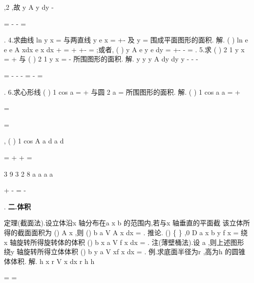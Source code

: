 ,2 ,故
y
A
y
dy
-


=
-
-
=




\int 
. 
4.求曲线
ln
y
x
=
与两直线
y
e
x
=
+-
及
y =
围成平面图形的面积. 
解.
(
)
ln
e
e
e
A
xdx
e
x dx
+
=
+
+-
=
\int 
\int 
;或者,
(
)
y
A
e
y
e
dy
=
+-
-
=
\int 
. 
5.求
(
)
2 1
y
x
=
+
与
(
)
2 1
y
x
=
-
所围图形的面积. 
解.
y
y
y
A
dy
dy
y
-
-
-






=
-
-
-
=
-
=












\int 
\int 
. 
6.求心形线
(
)
1 cos
a
\rho 
\theta 
=
+
与圆
2 a
\rho =
所围图形的面积. 
解.
(
)
1 cos
a
a
\rho 
\theta 
\pi 
\theta 
\rho 
=
+

\Rightarrow 
=

=

,
(
)
1 cos
A
a
d
a
d
\pi 
\pi 
\pi 
\theta 
\theta 
\theta 






=
+
+
=










\int 
{} 3
9 3
2 8
a
a
a
a
\pi 
\pi 
\pi 




+
-
=
-












. 
\vspace{4pt}
{\bfseries \textcolor{lyred}{二.体积}}

\textcolor{lyred}{定理(截面法)}.设立体\Omega 沿x 轴分布在a
x
b
\le 
\le 
的范围内,若与x 轴垂直的平面截 
该立体所得的截面面积为
()
A x ,则
()
b
a
V
A x dx
=\int 
. 
\textcolor{lyred}{推论}.
()
\{
\}
,0
D
a
x
b
y
f x
=
\le 
\le 
\le 
\le 
绕x 轴旋转所得旋转体的体积
()
b
x
a
V
f
x dx
\pi 
=\int 
. 
\textcolor{lyred}{注(薄壁桶法)}.设
a \ge 
,则上述图形绕y 轴旋转所得立体体积
()
b
y
a
V
xf x dx
\pi 
=
\int 
. 
\textcolor{lyred}{例}.求底面半径为r ,高为h 的圆锥体体积. 
解.
h
x
r
V
x
dx
r h
h
\pi 
\pi 


=
=





